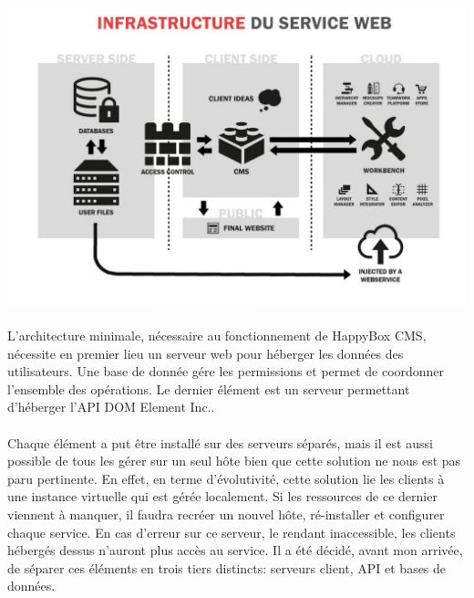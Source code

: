\documentclass[11pt, a4paper ]{article}
\begin{document}
\begin{spacing}{1.5}
\begin{center}
	\includegraphics[width=\textwidth]{images/media/fonctionnementHB.png}
\end{center}
\paragraph{}
L'architecture minimale, nécessaire au fonctionnement de HappyBox CMS, nécessite en premier lieu un serveur web pour héberger les données des utilisateurs. Une base de donnée gére les permissions et permet de coordonner l'ensemble des opérations. Le dernier élément est un serveur permettant d’héberger l'API DOM Element Inc..
\paragraph{}
Chaque élément a put être installé sur des serveurs séparés, mais il est aussi possible de tous les gérer sur un seul hôte bien que cette solution ne nous est pas paru pertinente. En effet, en terme d'évolutivité, cette solution lie les clients à une instance virtuelle qui est gérée localement.
Si les ressources de ce dernier viennent à manquer, il faudra recréer un nouvel hôte, ré-installer et configurer chaque service. En cas d'erreur sur ce serveur, le rendant inaccessible, les clients hébergés dessus n'auront plus accès au service.
Il a été décidé, avant mon arrivée, de séparer ces éléments en trois tiers distincts: serveurs client, API et bases de données.

\end{spacing}
\end{document}
